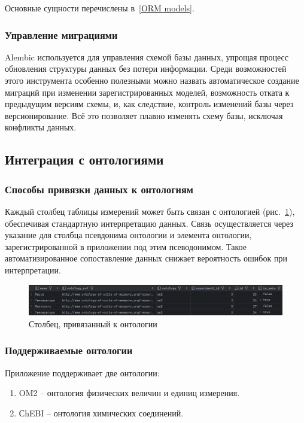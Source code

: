 Основные сущности перечислены в~\ref{ORM models}.

\subsubsection{Управление миграциями}

Alembic используется для управления схемой базы данных, упрощая процесс обновления структуры данных без потери информации.
Среди возможностей этого инструмента особенно полезными можно назвать автоматическое создание миграций при изменении зарегистрированных моделей, возможность отката к предыдущим версиям схемы, и, как следствие, контроль изменений базы через версионирование.
Всё это позволяет плавно изменять схему базы, исключая конфликты данных.

\subsection{Интеграция с онтологиями}

\subsubsection{Способы привязки данных к онтологиям}

Каждый столбец таблицы измерений может быть связан с онтологией (рис.~\ref{pic:linked_to_ontology_column}), обеспечивая стандартную интерпретацию данных.
Связь осуществляется через указание для столбца псевдонима онтологии и элемента онтологии, зарегистрированной в приложении под этим псеводонимом.
Такое автоматизированное сопоставление данных снижает вероятность ошибок при интерпретации.

\begin{figure}[H]
\centering
\includegraphics[width=\linewidth]{img/ontology_linking.png}
\caption{Столбец, привязанный к онтологии}
\label{pic:linked_to_ontology_column}
\end{figure}
\vspace{0.5cm}

\subsubsection{Поддерживаемые онтологии}

Приложение поддерживает две онтологии:
\begin{enumerate}
\item OM2 -- онтология физических величин и единиц измерения.
\item СhEBI -- онтология химических соединений.
\end{enumerate}

